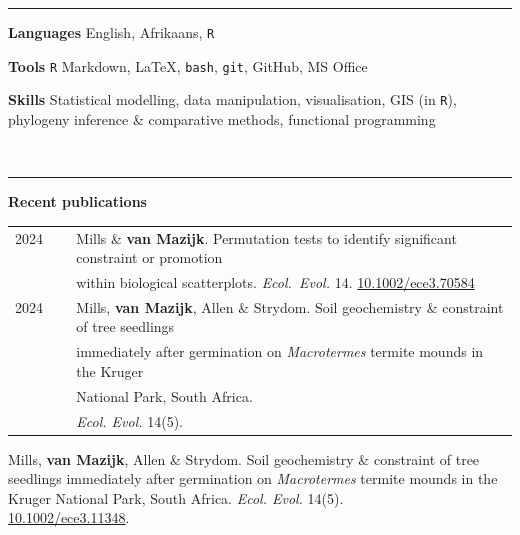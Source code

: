 \documentclass[12pt]{article}
\begin{document}
\bigskip
\hrule %
\bigskip

\textbf{Languages}     \hfill                  English, Afrikaans, \texttt{R}

\textbf{Tools    }     \hfill                            \texttt{R} Markdown,
                                        {\selectfont \LaTeX},
                               \texttt{bash}, \texttt{git}, GitHub, MS Office

\textbf{Skills  }      \hfill Statistical modelling, data manipulation, visualisation, GIS (in \texttt{R}), \\
                       \hfill phylogeny inference \& comparative methods, functional programming

\

\hrule %

\bigskip

\textbf{Recent publications}

\begin{tabular}{@{}l@{}l}

  2024 ~~~& Mills \& \textbf{van Mazijk}.
            Permutation tests to identify significant constraint or promotion \\
       ~~~& within biological scatterplots.
            \textit{Ecol.~Evol.} 14.
            \href{http://dx.doi.org/10.1002/ece3.70584}{10.1002/ece3.70584} \\
  2024 ~~~& Mills, \textbf{van Mazijk}, Allen \& Strydom.
            Soil geochemistry \& constraint of tree seedlings \\
       ~~~& immediately after germination on \textit{Macrotermes} termite mounds in the Kruger \\
       ~~~& National Park, South Africa. \\
       ~~~& \textit{Ecol. Evol.} 14(5).

\end{tabular}

Mills, \textbf{van Mazijk}, Allen \& Strydom.
Soil geochemistry \& constraint of tree seedlings immediately after
\hspace{2em} germination on \textit{Macrotermes} termite
  mounds in the Kruger National Park, South Africa.
  \textit{Ecol. Evol.} 14(5). \\
  \hspace{2em} \href{http://dx.doi.org/10.1002/ece3.11348}{10.1002/ece3.11348}.
\end{document}
